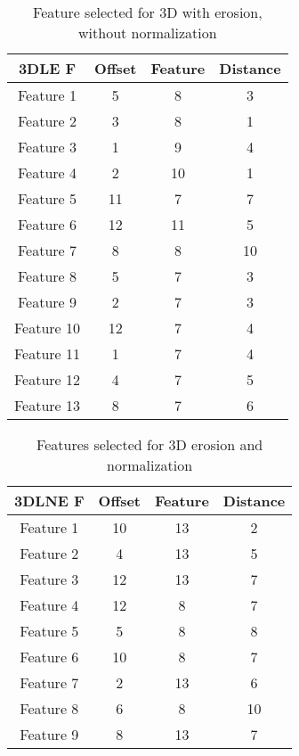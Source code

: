 \begin{table}[H]
  \centering
    \begin{tabular}{|c|c|c|c|}
     \hline
            3DLE F & Offset & Feature & Distance \\ \hline
          Feature 1& 5     & 8     & 3 \\ \hline
          Feature 2& 3     & 8     & 1 \\ \hline
          Feature 3& 1     & 9     & 4 \\ \hline
          Feature 4& 2     & 10    & 1 \\ \hline
          Feature 5& 11    & 7     & 7 \\ \hline
          Feature 6& 12    & 11    & 5 \\ \hline
          Feature 7& 8     & 8     & 10 \\ \hline
          Feature 8& 5     & 7     & 3 \\ \hline
          Feature 9& 2     & 7     & 3 \\ \hline
          Feature 10& 12    & 7     & 4 \\ \hline
          Feature 11& 1     & 7     & 4 \\ \hline
          Feature 12& 4     & 7     & 5 \\ \hline
          Feature 13& 8     & 7     & 6 \\
    \end{tabular}%
  \caption{Feature selected for 3D with erosion, without normalization}\label{tab:3DEnorm}%
\end{table}%


\begin{table}[H]
  \centering
    \begin{tabular}{|c|c|c|c|}
     \hline
    3DLNE F & Offset & Feature & Distance \\ \hline
          Feature 1& 10    & 13    & 2 \\ \hline
          Feature 2& 4     & 13    & 5 \\ \hline
          Feature 3& 12    & 13    & 7 \\ \hline
          Feature 4& 12    & 8     & 7 \\ \hline
          Feature 5& 5     & 8     & 8 \\ \hline
          Feature 6& 10    & 8     & 7 \\ \hline
          Feature 7& 2     & 13    & 6 \\ \hline
          Feature 8& 6     & 8     & 10 \\ \hline
          Feature 9& 8     & 13    & 7 \\ \hline
    \end{tabular}%
  \caption{Features selected for 3D erosion and normalization}\label{tab:3DLNE}%
\end{table}%

